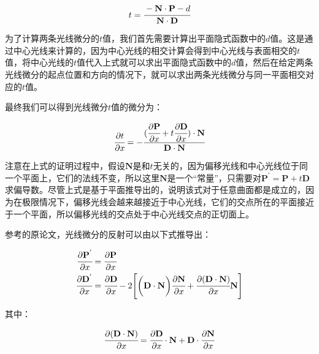 \begin{equation}
	t= \cfrac{-\mathbf{N}\cdot \mathbf{P}-d}{\mathbf{N}\cdot\mathbf{D}}
\end{equation}

\noindent  为了计算两条光线微分的$t$值，我们首先需要计算出平面隐式函数中的$d$值。这是通过中心光线来计算的，因为中心光线的相交计算会得到中心光线与表面相交的$t$值，将中心光线的$t$值代入上式就可以求出平面隐式函数中的$d$值，然后在给定两条光线微分的起点位置和方向的情况下，就可以求出两条光线微分与同一平面相交对应的$t$值。

\noindent 最终我们可以得到光线微分$t$值的微分为：

\begin{equation}
	 \cfrac{{\rm \partial} t}{{\rm \partial} x}=- \cfrac{( \cfrac{{\rm \partial}\mathbf{P}}{{\rm \partial} x} +t \cfrac{{\rm \partial}\mathbf{D}}{{\rm \partial} x})\cdot\mathbf{N}}{\mathbf{D}\cdot\mathbf{N}}
\end{equation}

注意在上式的证明过程中，假设$\mathbf{N}$是和$t$无关的，因为偏移光线和中心光线位于同一个平面上，它们的法线不变，所以这里$\mathbf{N}$是一个“常量”，只需要对$\mathbf{P}^{'}=\mathbf{P}+t\mathbf{D}$求偏导数。尽管上式是基于平面推导出的，\cite{a:TracingRayDifferentials}说明该式对于任意曲面都是成立的，因为在极限情况下，偏移光线会越来越接近于中心光线，它们的交点所在的平面接近于一个平面，所以偏移光线的交点处于中心光线交点的正切面上。

参考\cite{a:TracingRayDifferentials}的原论文，光线微分的反射可以由以下式推导出：

\begin{equation}
	\begin{aligned}
		 \cfrac{{\rm \partial}\mathbf{P}^{'}}{{\rm \partial} x}&= \cfrac{{\rm \partial}\mathbf{P}}{{\rm \partial} x}\\
		 \cfrac{{\rm \partial}\mathbf{D}^{'}}{{\rm \partial} x}&= \cfrac{{\rm \partial}\mathbf{D}}{{\rm \partial} x}-2\Bigg[\bigg(\mathbf{D}\cdot\mathbf{N}\bigg) \cfrac{{\rm \partial}\mathbf{N}}{{\rm \partial} x}+ \cfrac{{\rm \partial} (\mathbf{D}\cdot\mathbf{N})}{{\rm \partial} x}\mathbf{N}\Bigg]
	\end{aligned}
\end{equation}

\noindent 其中：

\begin{equation}
	 \cfrac{{\rm \partial} (\mathbf{D}\cdot\mathbf{N})}{{\rm \partial} x}= \cfrac{{\rm \partial}\mathbf{D}}{{\rm \partial} x}\cdot\mathbf{N}+\mathbf{D}\cdot \cfrac{{\rm \partial}\mathbf{N}}{{\rm \partial} x}
\end{equation}

